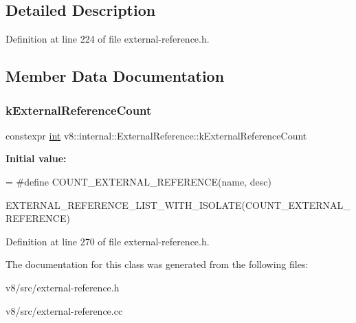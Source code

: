 \subsection{Detailed Description}


Definition at line 224 of file external-\/reference.\+h.



\subsection{Member Data Documentation}
\mbox{\label{classv8_1_1internal_1_1ExternalReference_a60bae333c90f7bccebd433815264c2ea}} 
\subsubsection{\texorpdfstring{k\+External\+Reference\+Count}{kExternalReferenceCount}}
{\footnotesize\ttfamily constexpr \mbox{\hyperlink{classint}{int}} v8\+::internal\+::\+External\+Reference\+::k\+External\+Reference\+Count\hspace{0.3cm}{\ttfamily [static]}}

{\bfseries Initial value\+:}
\begin{DoxyCode}
=
\textcolor{preprocessor}{#define COUNT\_EXTERNAL\_REFERENCE(name, desc) }

          EXTERNAL\_REFERENCE\_LIST\_WITH\_ISOLATE(COUNT\_EXTERNAL\_REFERENCE)
\end{DoxyCode}


Definition at line 270 of file external-\/reference.\+h.



The documentation for this class was generated from the following files\+:\begin{DoxyCompactItemize}
\item 
v8/src/external-\/reference.\+h\item 
v8/src/external-\/reference.\+cc\end{DoxyCompactItemize}
